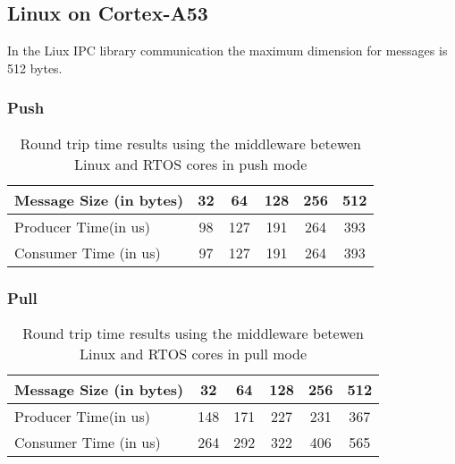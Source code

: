 \subsection{Linux on Cortex-A53}

In the Liux IPC library communication the maximum dimension for messages is
512 bytes.

\subsubsection{Push}

\begin{table}
\centering
\caption{Round trip time results using the middleware betewen Linux and RTOS
    cores in push mode}
\label{table:broker_communication_linux_RTOS_cores_push}
\begin{tabular}{lccccc}
\toprule
Message Size (in bytes) & 32 & 64 & 128 & 256 & 512 \\
\midrule
Producer Time(in us) & 98 & 127 & 191 & 264 & 393 \\
Consumer Time (in us) & 97 & 127 & 191 & 264 & 393 \\
\bottomrule
\end{tabular}
\end{table}

\subsubsection{Pull}

\begin{table}
\centering
\caption{Round trip time results using the middleware betewen Linux and RTOS
    cores in pull mode}
\label{table:broker_communication_linux_RTOS_cores_pull}
\begin{tabular}{lccccc}
\toprule
Message Size (in bytes) & 32 & 64 & 128 & 256 & 512 \\
\midrule
Producer Time(in us) & 148 & 171 & 227 & 231 & 367 \\
Consumer Time (in us) & 264 & 292 & 322 & 406 & 565 \\
\bottomrule
\end{tabular}
\end{table}
